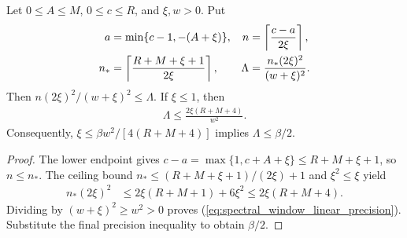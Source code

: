 \begin{lemma}
    \label{lem:spectral_window_uniform_envelope}
    \leanok
    Let $0\le A\le M$, $0\le c\le R$, and $\xi,w>0$. Put
    \begin{align}
        a       & =\min\{c-1,-(A+\xi)\},                          &
        n       & =\left\lceil\frac{c-a}{2\xi}\right\rceil,\notag   \\
        n_*     & =\left\lceil\frac{R+M+\xi+1}{2\xi}\right\rceil, &
        \Lambda & =\frac{n_*(2\xi)^2}{(w+\xi)^2}.
    \end{align}
    Then $n(2\xi)^2/(w+\xi)^2\le\Lambda$. If $\xi\le1$, then
    \begin{align}
        \Lambda\le\frac{2\xi(R+M+4)}{w^2}.
        \label{eq:spectral_window_linear_precision}
    \end{align}
    Consequently, $\xi\le\beta w^2/[4(R+M+4)]$ implies
    $\Lambda\le\beta/2$.
\end{lemma}
\begin{proof}\leanok
    The lower endpoint gives
    $c-a=\max\{1,c+A+\xi\}\le R+M+\xi+1$, so $n\le n_*$.
    The ceiling bound $n_*\le(R+M+\xi+1)/(2\xi)+1$ and
    $\xi^2\le\xi$ yield
    \begin{align}
        n_*(2\xi)^2
         & \le2\xi(R+M+1)+6\xi^2
        \le2\xi(R+M+4).
    \end{align}
    Dividing by $(w+\xi)^2\ge w^2>0$ proves
    (\ref{eq:spectral_window_linear_precision}). Substitute the final
    precision inequality to obtain $\beta/2$.
\end{proof}

